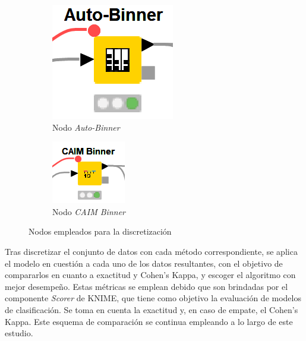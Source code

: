 \begin{figure}[H]
	\centering
	\begin{subfigure}[b]{0.25\linewidth}
		\centering
		\includegraphics[width=0.5\linewidth]{"figuras/capi 2/auto-binner-nodo"}
		\caption{Nodo \textit{Auto-Binner}}
		\label{fig:auto-binner-nodo}
	\end{subfigure}
	\hspace{1.5cm}
	\begin{subfigure}[b]{0.25\linewidth}
		\centering
		\includegraphics[width=0.5\linewidth]{"figuras/capi 2/caim-binner-nodo"}
		\caption{Nodo \textit{CAIM Binner}}
		\label{fig:caim-binner-nodo}
	\end{subfigure}
	\caption{Nodos empleados para la discretización}
	\label{fig:discretizacion-nodos}
\end{figure}

Tras discretizar el conjunto de datos con cada método correspondiente, se aplica el modelo en cuestión a cada uno de los datos resultantes, con el objetivo de compararlos en cuanto a exactitud y Cohen's Kappa, y escoger el algoritmo con mejor desempeño. Estas métricas se emplean debido que son brindadas por el componente \textit{Scorer} de KNIME, que tiene como objetivo la evaluación de modelos de clasificación. Se toma en cuenta la exactitud y, en caso de empate, el Cohen's Kappa. Este esquema de comparación se continua empleando a lo largo de este estudio.

